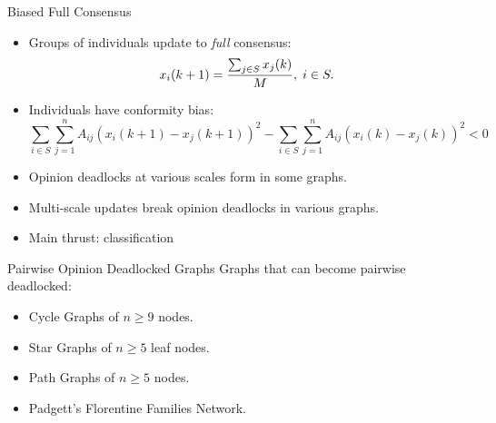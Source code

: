 \documentclass[usenames,dvipsnames,10pt]{beamer}
\theoremstyle{remark}
\begin{document}
\begin{frame}{Biased Full Consensus}
\begin{itemize}
    \item Groups of individuals update to \textit{full} consensus:
    \begin{equation}{\label{eq:updateRuleFull}}
        x_i(k+1) = \frac{\sum_{j\in S}x_j(k)}{M}, \; i\in S.
    \end{equation}
    \pause
    \item Individuals have conformity bias:
    \begin{equation*}
        \sum_{i\in S}\sum_{j=1}^nA_{ij}(x_i(k+1)-x_j(k+1))^2-\sum_{i\in S}\sum_{j=1}^nA_{ij}(x_i(k)-x_j(k))^2 < 0
    \end{equation*}
    \pause
    \item Opinion deadlocks at various scales form in some graphs.
	    \pause
    \item Multi-scale updates break opinion deadlocks in various graphs.
	    \pause
    \item Main thrust: classification
\end{itemize}
\end{frame}

\begin{frame}{Pairwise Opinion Deadlocked Graphs}
    Graphs that can become pairwise deadlocked:
    \begin{itemize}
        \item Cycle Graphs of $n\geq 9$ nodes.
        \item Star Graphs of $n\geq5$ leaf nodes.
        \item Path Graphs of $n\geq5$ nodes.
        \item Padgett's Florentine Families Network.
    \end{itemize}
\end{frame}
\end{document}
